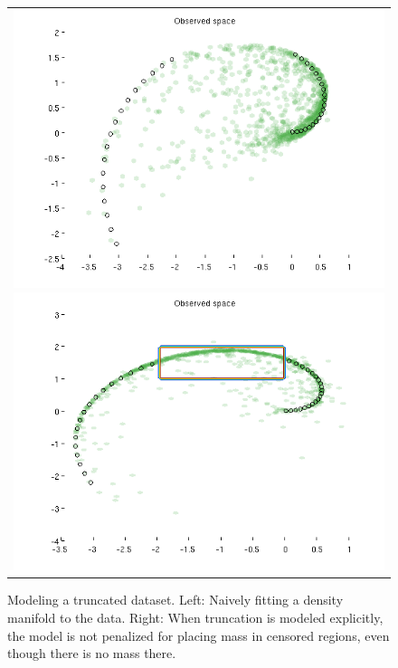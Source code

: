 \begin{figure}
\centering
\newcommand{\wmg}{0.5\columnwidth}  %
\newcommand{\hmg}{0.5\columnwidth}             %
\begin{tabular}{c}
\includegraphics[width=\wmg,height=\hmg]{figures/first_demo_nocensor} 
\includegraphics[width=\wmg,height=\hmg]{figures/second_demo_censor}
\end{tabular}
\caption{Modeling a truncated dataset.  Left:  Naively fitting a density manifold to the data.  Right:  When truncation is modeled explicitly, the model is not penalized for placing mass in censored regions, even though there is no mass there.}
\label{fig:synthetic}
\end{figure}

